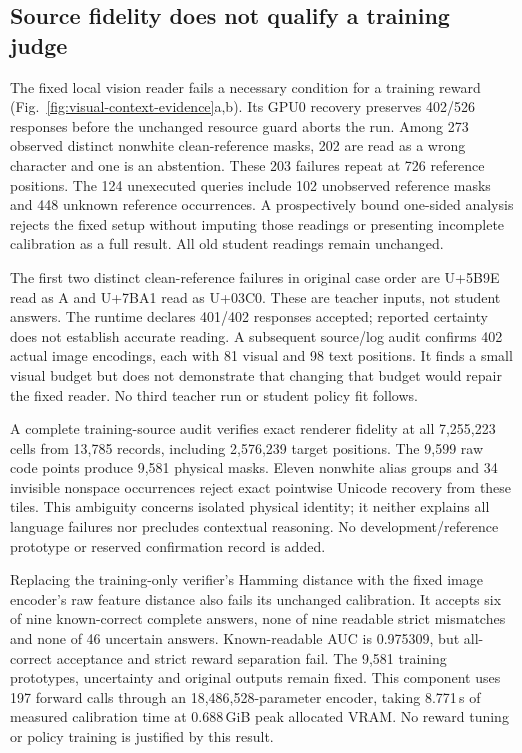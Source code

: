 \subsection*{Source fidelity does not qualify a training judge}

The fixed local vision reader fails a necessary condition for a training
reward (Fig.~\ref{fig:visual-context-evidence}a,b). Its GPU0 recovery preserves
402/526 responses before the unchanged resource guard aborts the run. Among
273 observed distinct nonwhite clean-reference masks, 202 are read as a wrong
character and one is an abstention. These 203 failures repeat at 726 reference
positions. The 124 unexecuted queries include 102 unobserved reference masks
and 448 unknown reference occurrences. A prospectively bound one-sided analysis
rejects the fixed setup without imputing those readings or presenting incomplete
calibration as a full result. All old student readings remain unchanged.

The first two distinct clean-reference failures in original case order are
U+5B9E read as A and U+7BA1 read as U+03C0. These are teacher inputs, not student
answers. The runtime declares 401/402 responses accepted; reported certainty
does not establish accurate reading. A subsequent source/log audit confirms
402 actual image encodings, each with 81 visual and 98 text positions. It finds
a small visual budget but does not demonstrate that changing that budget would
repair the fixed reader. No third teacher run or student policy fit follows.

A complete training-source audit verifies exact renderer fidelity at all
7,255,223 cells from 13,785 records, including 2,576,239 target positions.
The 9,599 raw code points produce 9,581 physical masks. Eleven nonwhite alias
groups and 34 invisible nonspace occurrences reject exact pointwise Unicode
recovery from these tiles. This ambiguity concerns isolated physical identity;
it neither explains all language failures nor precludes contextual reasoning.
No development/reference prototype or reserved confirmation record is added.

Replacing the training-only verifier's Hamming distance with the fixed image
encoder's raw feature distance also fails its unchanged calibration. It accepts
six of nine known-correct complete answers, none of nine readable strict
mismatches and none of 46 uncertain answers. Known-readable AUC is 0.975309,
but all-correct acceptance and strict reward separation fail. The 9,581 training
prototypes, uncertainty and original outputs remain fixed. This component uses
197 forward calls through an 18,486,528-parameter encoder, taking 8.771\,s of
measured calibration time at 0.688\,GiB peak allocated VRAM. No reward tuning
or policy training is justified by this result.

